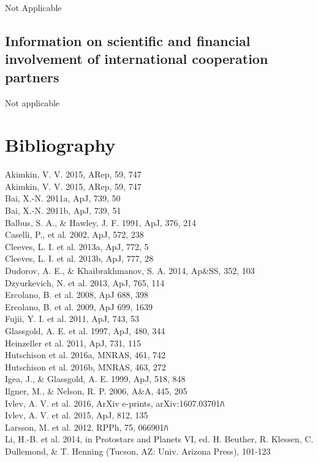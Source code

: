 \documentclass[10pt,fleqn,twoside]{article}
\newcommand{\Tcol}{\color{blue}}
\begin{document}
Not Applicable 

\subsection{\Tcol Information on scientific and financial involvement of international cooperation partners}

Not applicable 

\section{\Tcol Bibliography}

\noindent
Akimkin, V. V. 2015, ARep, 59, 747 \\
Akimkin, V. V. 2015, ARep, 59, 747 \\
Bai, X.-N. 2011a, ApJ, 739, 50 \\
Bai, X.-N. 2011b, ApJ, 739, 51 \\
Balbus, S. A., \& Hawley, J. F. 1991, ApJ, 376, 214 \\
Caselli, P., et al. 2002, ApJ, 572, 238 \\
Cleeves, L. I. et al. 2013a, ApJ, 772, 5 \\
Cleeves, L. I. et al. 2013b, ApJ, 777, 28 \\
Dudorov, A. E., \& Khaibrakhmanov, S. A. 2014, Ap\&SS, 352, 103 \\
Dzyurkevich, N. et al. 2013, ApJ, 765, 114 \\
Ercolano, B. et al. 2008, ApJ 688, 398 \\
Ercolano, B. et al. 2009, ApJ 699, 1639\\
Fujii, Y. I. et al. 2011, ApJ, 743, 53 \\
Glassgold, A. E. et al. 1997, ApJ, 480, 344 \\
Heinzeller et al. 2011, ApJ, 731, 115 \\
Hutschison et al. 2016a, MNRAS, 461, 742\\
Hutschison et al. 2016b, MNRAS, 463, 272\\ 
Igea, J., \& Glassgold, A. E. 1999, ApJ, 518, 848 \\
Ilgner, M., \& Nelson, R. P. 2006, A\&A, 445, 205 \\
Ivlev, A. V. et al. 2016, ArXiv e-prints, arXiv:1607.03701ﾊ\\ 
Ivlev, A. V. et al.  2015, ApJ, 812, 135 \\
Larsson, M. et al. 2012, RPPh, 75, 066901ﾊ\\  
Li, H.-B. et al. 2014, in Protostars and Planets VI, ed. H. Beuther, R. Klessen, C. Dullemond, \& T. Henning (Tucson, AZ: Univ. Arizona Press), 101-123 \\
\end{document}
